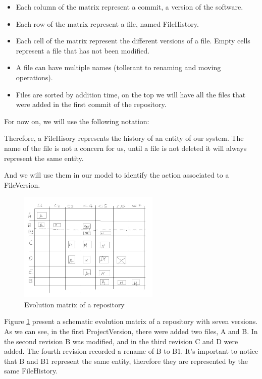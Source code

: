 \begin{itemize}
    \item Each column of the matrix represent a commit, a version of the software.
    \item Each row of the matrix represent a file, named FileHistory.
    \item Each cell of the matrix represent the different versions of a file. Empty cells represent a file that has not been modified.
    \item A file can have multiple names (tollerant to renaming and moving operations).
    \item Files are sorted by addition time, on the top we will have all the files that were added in the first commit of the repository. 
\end{itemize}

For now on, we will use the following notation:


Therefore, a FileHisory represents the history of an entity of our system. 
The name of the file is not a concern for us, until a file is not deleted it will always represent the same entity. 


And we will use them in our model to identify the action associated to a FileVersion. 
\begin{figure}
    \center
    \includegraphics[width=0.6\textwidth]{ApproachMatrix.jpg}
    \caption{Evolution matrix of a repository}
    \label{fig:evolutionMatrixApproach}
\end{figure}
Figure \ref{fig:evolutionMatrixApproach} present a schematic evolution matrix of a repository with seven versions.
As we can see, in the first ProjectVersion, there were added two files, A and B. In the second revision B was modified, and in the third revision C and D were added.
The fourth revision recorded a rename of B to B1.
It's important to notice that B and B1 represent the same entity, therefore they are represented by the same FileHistory.\\



